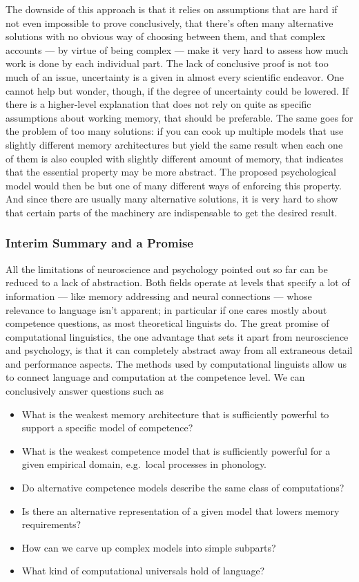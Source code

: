 The downside of this approach is that it relies on assumptions that are hard if not even impossible to prove conclusively, that there's often many alternative solutions with no obvious way of choosing between them, and that complex accounts --- by virtue of being complex --- make it very hard to assess how much work is done by each individual part.
The lack of conclusive proof is not too much of an issue, uncertainty is a given in almost every scientific endeavor.
One cannot help but wonder, though, if the degree of uncertainty could be lowered.
If there is a higher-level explanation that does not rely on quite as specific assumptions about working memory, that should be preferable.
The same goes for the problem of too many solutions: if you can cook up multiple models that use slightly different memory architectures but yield the same result when each one of them is also coupled with slightly different amount of memory, that indicates that the essential property may be more abstract.
The proposed psychological model would then be but one of many different ways of enforcing this property.
And since there are usually many alternative solutions, it is very hard to show that certain parts of the machinery are indispensable to get the desired result.

\subsubsection{Interim Summary and a Promise}

All the limitations of neuroscience and psychology pointed out so far can be reduced to a lack of abstraction.
Both fields operate at levels that specify a lot of information --- like memory addressing and neural connections --- whose relevance to language isn't apparent; in particular if one cares mostly about competence questions, as most theoretical linguists do.
The great promise of computational linguistics, the one advantage that sets it apart from neuroscience and psychology, is that it can completely abstract away from all extraneous detail and performance aspects.
The methods used by computational linguists allow us to connect language and computation at the competence level. 
We can conclusively answer questions such as
%
\begin{itemize}
    \item What is the weakest memory architecture that is sufficiently powerful to support a specific model of competence?
    \item What is the weakest competence model that is sufficiently powerful for a given empirical domain, e.g.\ local processes in phonology.
    \item Do alternative competence models describe the same class of computations?
    \item Is there an alternative representation of a given model that lowers memory requirements?
    \item How can we carve up complex models into simple subparts? 
    \item What kind of computational universals hold of language?
\end{itemize}


